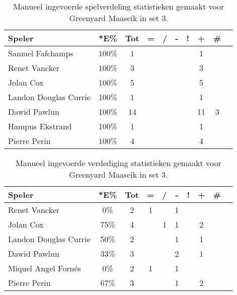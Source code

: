 \begin{table}[ht!]
    \centering
    \scriptsize
    \begin{tabular}{|l|c|c|c|c|c|c|c|c|c|} \hline
        \textbf{Speler} & *E\% & Tot & = & / & - & ! & + & \# \\ \hline
        Samuel Fafchamps  & 100\% & 1 &  &  &  &  & 1 &  \\ 
        Renet Vancker & 100\% & 3 &  &  &  &  & 3 &  \\
        Jolan Cox & 100\% & 5 &  &  &  &  & 5 &  \\ 
        Landon Douglas Currie & 100\% & 1 &  &  &  &  & 1 &  \\ 
        Dawid Pawlun & 100\% & 14 &  &  &  &  & 11 & 3 \\ 
        Hampus Ekstrand & 100\% & 1 &  &  &  &  & 1 &  \\
        Pierre Perin & 100\% & 4 &  &  &  &  & 4 &  \\ \hline
    \end{tabular}
    \caption[Manueel ingevoerde spelverdelingsstatistieken gemaakt voor Greenyard Maaseik in set 3]{\label{tab:PL1SetMaaseikMan3}Manueel ingevoerde spelverdeling statistieken gemaakt voor Greenyard Maaseik in set 3.}
\end{table}

\begin{table}[ht!]
    \centering
    \scriptsize
    \begin{tabular}{|l|c|c|c|c|c|c|c|c|c|} \hline
        \textbf{Speler} & *E\% & Tot & = & / & - & ! & + & \#\\ \hline
        Renet Vancker & 0\% & 2 & 1 &  & 1 &  &  &  \\ 
        Jolan Cox & 75\% & 4 &  & 1 & 1 &  & 2 &  \\ 
        Landon Douglas Currie & 50\% & 2 &  &  & 1 &  & 1 &  \\ 
        Dawid Pawlun & 33\% & 3 &  &  & 2 &  & 1 &  \\ 
        Miquel Angel Fornés & 0\% & 2 & 1 &  & 1 &  &  &  \\ 
        Pierre Perin & 67\% & 3 &  &  & 1 &  & 2 &  \\ \hline
    \end{tabular}
    \caption[Manueel ingevoerde verdedigingsstatistieken gemaakt voor Greenyard Maaseik in set 3]{\label{tab:PL1DigMaaseikMan3}Manueel ingevoerde verdediging statistieken gemaakt voor Greenyard Maaseik in set 3.}
\end{table}

